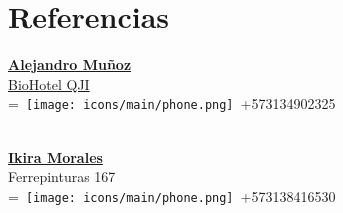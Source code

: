\documentclass[]{plushcv}
\begin{document}
\begin{minipage}[t]{0.25\textwidth}


\sectionsep

\section{Referencias} 
\sectionsep
\href{https://qjibiohotellodge.com/}{\textbf{Alejandro Muñoz}\\
  BioHotel QJI}
\\
\begingroup
{}=\hbox{
  \texttt{[image: icons/main/phone.png]}\hspace{0.3cm} +573134902325
}
\parbox{\wd0}{}
\endgroup
\sectionsep
\\

\sectionsep
\href{}{\textbf{Ikira Morales}}\\
Ferrepinturas 167 
\\
\begingroup
{}=\hbox{
\texttt{[image: icons/main/phone.png]}\hspace{0.3cm} +573138416530
}
\parbox{\wd0}{}
\endgroup
\\





\end{minipage}
\end{document}
